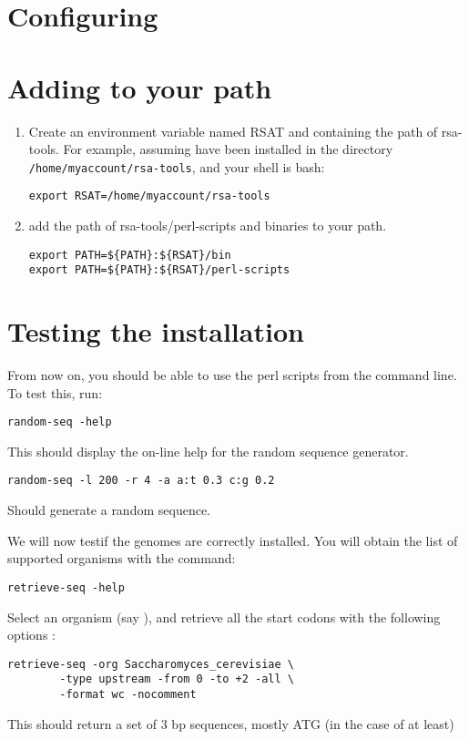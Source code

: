 \documentclass{article}
\begin{document}
\section{Configuring \RSAT}

\section{Adding \RSAT to your path}

\begin{enumerate}

\item Create an environment variable named RSAT and containing the
path of rsa-tools. For example, assuming \RSAT have been installed
in the directory \texttt{/home/myaccount/rsa-tools}, and your shell is
bash:

\begin{verbatim}
export RSAT=/home/myaccount/rsa-tools
\end{verbatim}

\item add the path of rsa-tools/perl-scripts and binaries to your path.

\begin{verbatim}
export PATH=${PATH}:${RSAT}/bin
export PATH=${PATH}:${RSAT}/perl-scripts
\end{verbatim}

\end{enumerate}

\section{Testing the installation}

From now on, you should be able to use the perl scripts from the
command line. To test this, run: 

\begin{verbatim}
random-seq -help
\end{verbatim}

This should display the on-line help for the random sequence
generator. 

\begin{verbatim}
random-seq -l 200 -r 4 -a a:t 0.3 c:g 0.2
\end{verbatim}

Should generate a random sequence.

We will now testif the genomes are correctly installed. You will
obtain the list of supported organisms with the command:

\begin{verbatim}
retrieve-seq -help
\end{verbatim}

Select an organism (say ), and
retrieve all the start codons with the following options :

\begin{verbatim}
retrieve-seq -org Saccharomyces_cerevisiae \
        -type upstream -from 0 -to +2 -all \
        -format wc -nocomment 
\end{verbatim}

This should return a set of 3 bp sequences, mostly ATG (in the case of
 at least)
\end{document}
